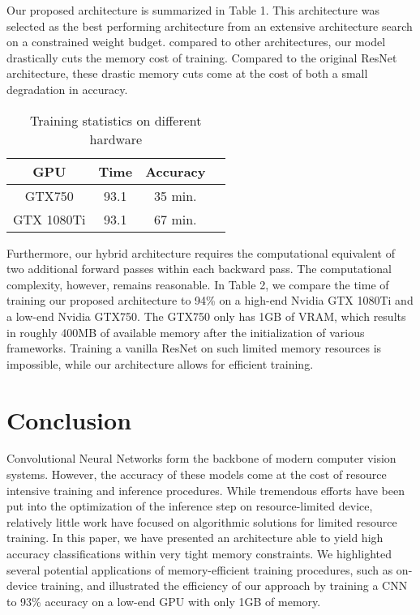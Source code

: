 \documentclass[twocolumn]{bmcart}
\begin{document}
Our proposed architecture is summarized in Table 1.
This architecture was selected as the best performing architecture 
from an extensive architecture search on a constrained weight budget. 
compared to other architectures, our model drastically cuts the memory cost of training.
Compared to the original ResNet architecture, these drastic memory cuts come at the cost of 
both a small degradation in accuracy.

\begin{table}[h]
\begin{tabular}{ c c c c}	
 GPU & Time & Accuracy \\
\hline			
GTX750     & 93.1  & 35 min.    \\
GTX 1080Ti & 93.1  & 67 min.  \\
\hline
\end{tabular}
\caption{Training statistics on different hardware}
\end{table}

Furthermore, our hybrid architecture requires the computational equivalent of two additional forward passes within each backward pass.
The computational complexity, however, remains reasonable. 
In Table 2, we compare the time of training our proposed architecture to 94\% on a high-end Nvidia GTX 1080Ti and a low-end
Nvidia GTX750.
The GTX750 only has 1GB of VRAM, which results in roughly 400MB of available memory after the initialization of various frameworks.
Training a vanilla ResNet on such limited memory resources is impossible, while our architecture allows for efficient training. 

\section{Conclusion}

Convolutional Neural Networks form the backbone of modern computer vision systems.
However, the accuracy of these models come at the cost of resource intensive training and inference procedures.
While tremendous efforts have been put into the optimization of the inference step on resource-limited device,
relatively little work have focused on algorithmic solutions for limited resource training. 
In this paper, we have presented an architecture able to yield high accuracy classifications within very tight memory constraints.
We highlighted several potential applications of memory-efficient training procedures, such as on-device training,
and illustrated the efficiency of our approach by training a CNN to 93\% accuracy on a low-end GPU with only 1GB of memory.
\end{document}
